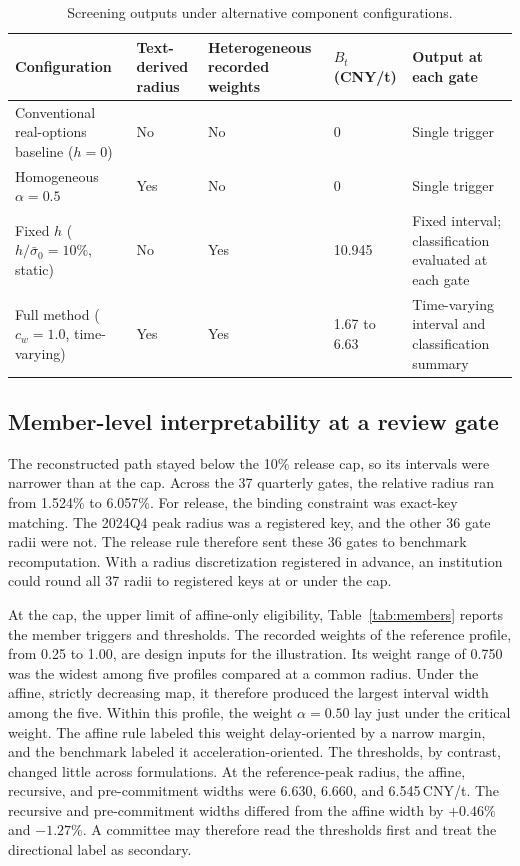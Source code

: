 \documentclass[5p,times,authoryear]{elsarticle}
\theoremstyle{plain}
\newcommand{\sbar}{\bar{\sigma}_0}
\begin{document}
\begin{table}[!t]
\caption{Screening outputs under alternative component configurations.}
\label{tab:components}
\centering
\footnotesize
\begin{tabular}{@{}L{0.27\textwidth}L{0.11\textwidth}L{0.15\textwidth}L{0.1\textwidth}L{0.25\textwidth}@{}}
\toprule
Configuration & Text-derived radius & Heterogeneous recorded weights & $B_t$ (CNY/t) & Output at each gate\\
\midrule
Conventional real-options baseline ($h=0$) & No & No & 0 & Single trigger\\
Homogeneous $\alpha=0.5$ & Yes & No & 0 & Single trigger\\
Fixed $h$ ($h/\sbar=10\%$, static) & No & Yes & 10.945 & Fixed interval; classification evaluated at each gate\\
Full method ($c_w=1.0$, time-varying) & Yes & Yes & 1.67 to 6.63 & Time-varying interval and classification summary\\
\bottomrule
\end{tabular}
\end{table}

\subsection{Member-level interpretability at a review gate}

The reconstructed path stayed below the 10\% release cap, so its intervals were narrower than at the cap. Across the 37 quarterly gates, the relative radius ran from 1.524\% to 6.057\%. For release, the binding constraint was exact-key matching. The 2024Q4 peak radius was a registered key, and the other 36 gate radii were not. The release rule therefore sent these 36 gates to benchmark recomputation. With a radius discretization registered in advance, an institution could round all 37 radii to registered keys at or under the cap. 

At the cap, the upper limit of affine-only eligibility, Table~\ref{tab:members} reports the member triggers and thresholds. The recorded weights of the reference profile, from 0.25 to 1.00, are design inputs for the illustration. Its weight range of 0.750 was the widest among five profiles compared at a common radius. Under the affine, strictly decreasing map, it therefore produced the largest interval width among the five. Within this profile, the weight $\alpha=0.50$ lay just under the critical weight. The affine rule labeled this weight delay-oriented by a narrow margin, and the benchmark labeled it acceleration-oriented. The thresholds, by contrast, changed little across formulations. At the reference-peak radius, the affine, recursive, and pre-commitment widths were 6.630, 6.660, and 6.545\,CNY/t. The recursive and pre-commitment widths differed from the affine width by $+0.46\%$ and $-1.27\%$. A committee may therefore read the thresholds first and treat the directional label as secondary.
\end{document}
